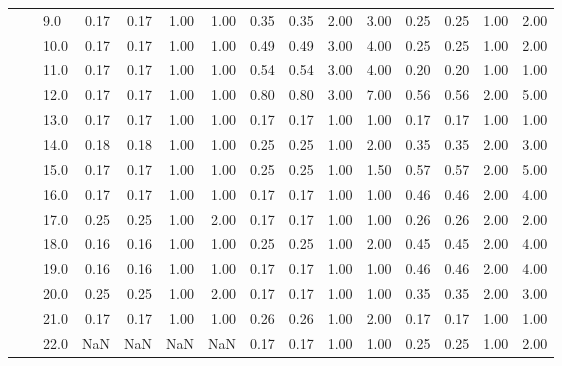 \begin{tabular}{lllrrrrrrrrrrrr}
       &     & 9.0  &       0.17 &      0.17 & 1.00 &   1.00 &       0.35 &      0.35 &  2.00 &   3.00 &       0.25 &      0.25 &  1.00 &   2.00 \\
       &     & 10.0 &       0.17 &      0.17 & 1.00 &   1.00 &       0.49 &      0.49 &  3.00 &   4.00 &       0.25 &      0.25 &  1.00 &   2.00 \\
       &     & 11.0 &       0.17 &      0.17 & 1.00 &   1.00 &       0.54 &      0.54 &  3.00 &   4.00 &       0.20 &      0.20 &  1.00 &   1.00 \\
       &     & 12.0 &       0.17 &      0.17 & 1.00 &   1.00 &       0.80 &      0.80 &  3.00 &   7.00 &       0.56 &      0.56 &  2.00 &   5.00 \\
       &     & 13.0 &       0.17 &      0.17 & 1.00 &   1.00 &       0.17 &      0.17 &  1.00 &   1.00 &       0.17 &      0.17 &  1.00 &   1.00 \\
       &     & 14.0 &       0.18 &      0.18 & 1.00 &   1.00 &       0.25 &      0.25 &  1.00 &   2.00 &       0.35 &      0.35 &  2.00 &   3.00 \\
       &     & 15.0 &       0.17 &      0.17 & 1.00 &   1.00 &       0.25 &      0.25 &  1.00 &   1.50 &       0.57 &      0.57 &  2.00 &   5.00 \\
       &     & 16.0 &       0.17 &      0.17 & 1.00 &   1.00 &       0.17 &      0.17 &  1.00 &   1.00 &       0.46 &      0.46 &  2.00 &   4.00 \\
       &     & 17.0 &       0.25 &      0.25 & 1.00 &   2.00 &       0.17 &      0.17 &  1.00 &   1.00 &       0.26 &      0.26 &  2.00 &   2.00 \\
       &     & 18.0 &       0.16 &      0.16 & 1.00 &   1.00 &       0.25 &      0.25 &  1.00 &   2.00 &       0.45 &      0.45 &  2.00 &   4.00 \\
       &     & 19.0 &       0.16 &      0.16 & 1.00 &   1.00 &       0.17 &      0.17 &  1.00 &   1.00 &       0.46 &      0.46 &  2.00 &   4.00 \\
       &     & 20.0 &       0.25 &      0.25 & 1.00 &   2.00 &       0.17 &      0.17 &  1.00 &   1.00 &       0.35 &      0.35 &  2.00 &   3.00 \\
       &     & 21.0 &       0.17 &      0.17 & 1.00 &   1.00 &       0.26 &      0.26 &  1.00 &   2.00 &       0.17 &      0.17 &  1.00 &   1.00 \\
       &     & 22.0 &        NaN &       NaN &  NaN &    NaN &       0.17 &      0.17 &  1.00 &   1.00 &       0.25 &      0.25 &  1.00 &   2.00 \\

\end{tabular}
